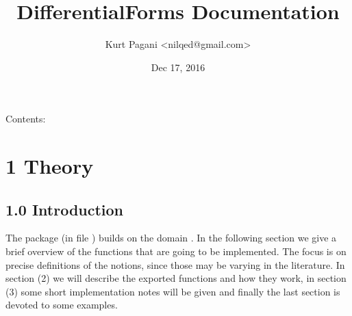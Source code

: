 \documentclass[letterpaper,10pt,english]{sphinxmanual}
\title{DifferentialForms Documentation}
\date{Dec 17, 2016}
\author{Kurt Pagani \textless{}nilqed@gmail.com\textgreater{}}
\begin{document}
\maketitle
\tableofcontents
{}\label{index::doc}


Contents:


\chapter{1 Theory}
\label{section-1.0:introduction}\label{section-1.0:fricas-differentialforms}\label{section-1.0::doc}\label{section-1.0:theory}

\section{1.0 Introduction}
\label{section-1.0:id1}
The package  (in file ) builds on the
domain . In the following section we give a brief overview
of the functions that are going to be implemented. The focus is on precise
definitions of the notions, since those may be varying in the literature.
In section (2) we will describe the exported functions and how they work,
in section (3) some short implementation notes will be given and finally
the last section is devoted to some examples.
\end{document}
